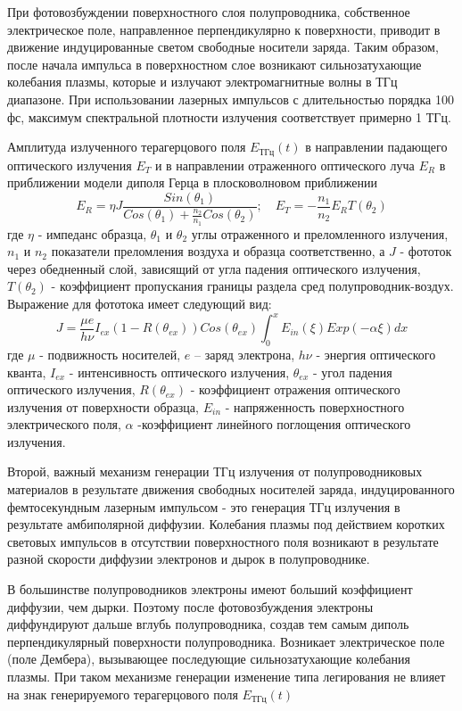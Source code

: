 \documentclass[a4paper,14pt,russian]{extreport}
\begin{document}
				При фотовозбуждении поверхностного слоя полупроводника, собственное электрическое поле, направленное перпендикулярно к поверхности, приводит в движение индуцированные светом свободные носители заряда. Таким образом, после начала импульса в поверхностном слое возникают сильнозатухающие колебания плазмы, которые и излучают электромагнитные волны в ТГц диапазоне. При использовании лазерных импульсов с длительностью порядка 100 фс, максимум спектральной плотности излучения соответствует примерно 1 ТГц.\par
				Амплитуда излученного терагерцового поля $E_{\text{ТГц}}(t)$ в направлении падающего оптического излучения $E_T$ и в направлении отраженного оптического луча $E_R$ в приближении модели диполя Герца в плосковолновом приближении
				\begin{equation}\label{THzAmplitude}
					E_R = \eta J \frac{Sin(\theta_1)}{Cos(\theta_1)+\frac{n_2}{n_1}Cos(\theta_2)}; \quad
					E_T = -\frac{n_1}{n_2}E_R T(\theta_2)
				\end{equation}
				где $\eta$ - импеданс образца, $\theta_1$ и $\theta_2$ углы отраженного и преломленного излучения, $n_1$ и $n_2$ показатели преломления воздуха и образца соответственно, а $J$ - фототок через обедненный слой, зависящий от угла падения оптического излучения, $T(\theta_2)$ - коэффициент пропускания границы раздела сред полупроводник-воздух. Выражение для фототока имеет следующий вид:
				\begin{equation}\label{CurrentDencity}
					J = \frac{\mu e}{h \nu} I_{ex}(1-R(\theta_{ex}))Cos(\theta_{ex})\int_0^{x}E_{in}(\xi)Exp(-\alpha \xi)dx
				\end{equation}
				где $\mu$ - подвижность носителей, $e$ – заряд электрона, $h \nu$ - энергия оптического
кванта, $I_{ex}$ - интенсивность оптического излучения, $\theta_{ex}$ - угол падения оптического излучения, $R(\theta_{ex})$ - коэффициент отражения оптического излучения от поверхности образца, $E_{in}$ - напряженность поверхностного электрического поля, $\alpha$ -коэффициент линейного поглощения оптического излучения.\par
				Второй, важный механизм генерации ТГц излучения от полупроводниковых материалов в результате движения свободных носителей заряда, индуцированного фемтосекундным лазерным импульсом - это генерация ТГц излучения в результате амбиполярной диффузии. Колебания плазмы под действием коротких световых импульсов в отсутствии
поверхностного поля возникают в результате разной скорости диффузии электронов и дырок в полупроводнике.\par
				В большинстве полупроводников электроны имеют больший коэффициент диффузии, чем дырки. Поэтому после	фотовозбуждения электроны диффундируют дальше вглубь полупроводника, создав тем самым диполь перпендикулярный поверхности полупроводника. Возникает электрическое поле (поле Дембера), вызывающее последующие сильнозатухающие колебания плазмы. При таком механизме генерации изменение типа легирования не влияет на знак генерируемого терагерцового поля $E_{\text{ТГц}}(t)$
\end{document}

